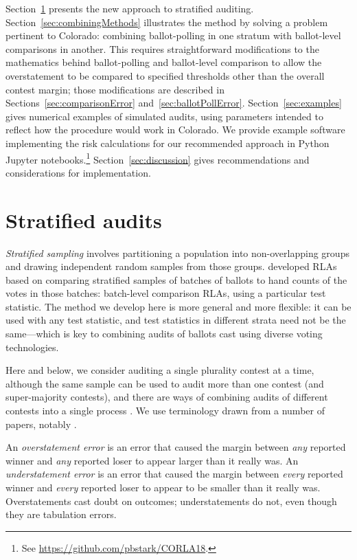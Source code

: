 \documentclass[runningheads]{llncs}
\begin{document}
Section~\ref{sec:stratified} presents the new approach to stratified auditing.
Section~\ref{sec:combiningMethods} illustrates the method by solving a problem pertinent to Colorado:
combining ballot-polling in one stratum with ballot-level comparisons in another.
This requires straightforward modifications to the mathematics behind ballot-polling and ballot-level comparison to allow the overstatement to be compared to specified thresholds other than the overall contest margin; those modifications are described in Sections~\ref{sec:comparisonError} and~\ref{sec:ballotPollError}.
Section~\ref{sec:examples} gives numerical examples of simulated audits, using parameters intended to reflect how the procedure would work in Colorado.
We provide example software implementing the risk calculations for
our recommended approach in Python Jupyter notebooks.\footnote{%
 See \url{https://github.com/pbstark/CORLA18}.
}
Section~\ref{sec:discussion} gives recommendations and
considerations for implementation.

\section{Stratified audits} \label{sec:stratified}

\emph{Stratified sampling} involves partitioning a population
into non-overlapping groups and drawing independent random samples from those groups.
\cite{stark08a,higginsEtal11} developed RLAs based on comparing stratified samples of batches of ballots to hand counts of the votes in those batches: batch-level comparison RLAs, using a particular test statistic.
The method we develop here is more general and more flexible: it can be used with any test statistic, and test statistics in different strata need not be the same---which is key to combining audits of ballots cast using diverse voting technologies.

Here and below, we consider auditing a single plurality contest at a time, although the same sample can be used to audit more than one contest (and super-majority contests), and there are ways of combining audits of different contests into a single process \cite{stark09c,stark10d}.
We use terminology drawn from a number of papers, notably \cite{lindemanStark12}.

An \emph{overstatement error} is an error that caused the margin between \emph{any} reported
winner and \emph{any} reported loser to appear larger than it really was.
An \emph{understatement error} is an error that caused the margin between \emph{every} reported
winner and \emph{every} reported loser to appear to be smaller than it really was.
Overstatements cast doubt on outcomes; understatements do not, even though they are tabulation errors.
\end{document}
